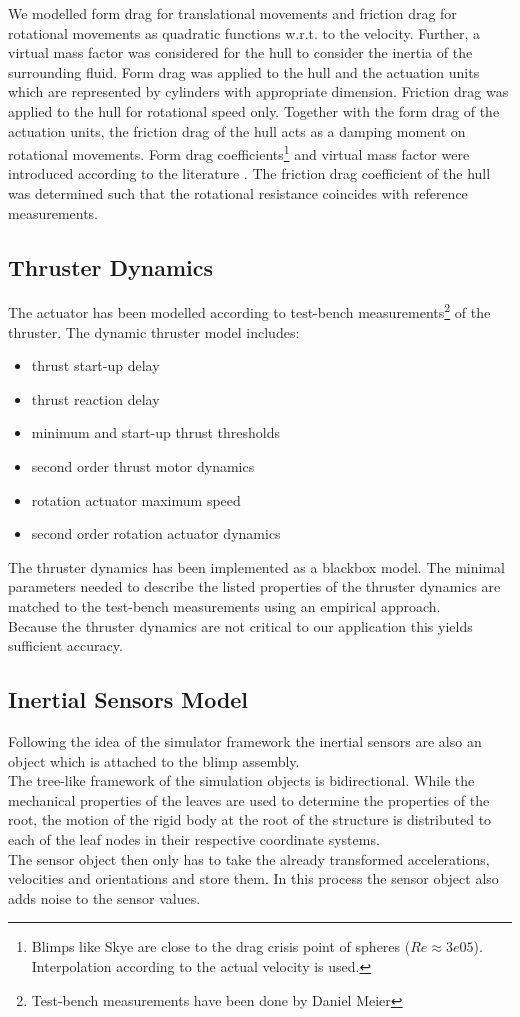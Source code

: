 We modelled form drag for translational movements and friction drag for rotational movements as quadratic functions w.r.t. to the velocity.
Further, a virtual mass factor was considered for the hull to consider the inertia of the surrounding fluid.
Form drag was applied to the hull and the actuation units which are represented by cylinders with appropriate dimension.
Friction drag was applied to the hull for rotational speed only.
Together with the form drag of the actuation units, the friction drag of the hull acts as a damping moment on rotational movements.
Form drag coefficients\footnote{
Blimps like Skye are close to the drag crisis point of spheres ($Re\approx3e05$). Interpolation according to the actual velocity is used.} and virtual mass factor were introduced according to the literature \citep{Kundu2012}.
The friction drag coefficient of the hull was determined such that the rotational resistance coincides with reference measurements.

\subsection{Thruster Dynamics}
\label{sub:thrust_dynamics}
The actuator has been modelled according to test-bench measurements\footnote{Test-bench measurements have been done by Daniel Meier} of the thruster.
The dynamic thruster model includes:
\begin{itemize}
\item thrust start-up delay
\item thrust reaction delay
\item minimum and start-up thrust thresholds
\item second order thrust motor dynamics
\item rotation actuator maximum speed
\item second order rotation actuator dynamics
\end{itemize}
The thruster dynamics has been implemented as a blackbox model.
The minimal parameters needed to describe the listed properties of the thruster dynamics are matched to the test-bench measurements using an empirical approach.  \\
Because the thruster dynamics are not critical to our application this yields sufficient accuracy.

\subsection{Inertial Sensors Model}
\label{sub:imu_model}
Following the idea of the simulator framework the inertial sensors are also an object which is attached to the blimp assembly. \\
The tree-like framework of the simulation objects is bidirectional.
While the mechanical properties of the leaves are used to determine the properties of the root,
the motion of the rigid body at the root of the structure is distributed to each of the leaf nodes in their respective coordinate systems. \\
The sensor object then only has to take the already transformed accelerations, velocities and orientations and store them.
In this process the sensor object also adds noise to the sensor values.

